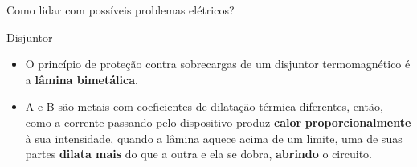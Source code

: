 \begin{frame}{Como lidar com possíveis problemas elétricos?}
	\begin{block}{Disjuntor}
		\begin{itemize}
			\item O princípio de proteção contra sobrecargas de um disjuntor termomagnético é a \textbf{lâmina bimetálica}.
		\end{itemize}
	\end{block}
	\begin{center}
	\end{center}
	\begin{block}{}
		\begin{itemize}
			\item A e B são metais com coeficientes de dilatação térmica diferentes, então, como a corrente passando pelo dispositivo produz \textbf{calor} \textbf{proporcionalmente} à sua intensidade, quando a lâmina aquece acima de um limite, uma de suas partes \textbf{dilata mais} do que a outra e ela se dobra, \textbf{abrindo} o circuito.
		\end{itemize}
	\end{block}
\end{frame}

